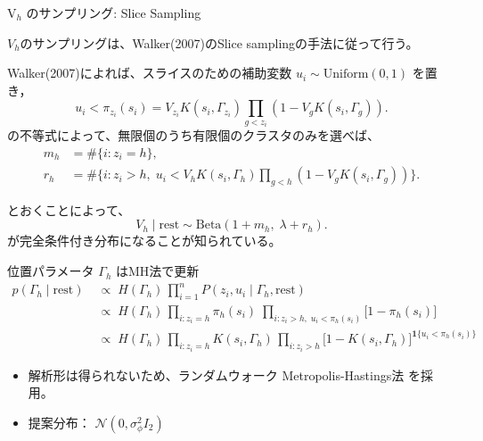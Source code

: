 \documentclass[xelatex, 8pt]{beamer}
\theoremstyle{plain}
\theoremstyle{definition}
\begin{document}
\begin{frame}{V\(_h\) のサンプリング: Slice Sampling}

$V_h$のサンプリングは、Walker(2007)\cite{Walker2007-aj}のSlice samplingの手法に従って行う。

Walker(2007)\cite{Walker2007-aj}によれば、スライスのための補助変数\; \(u_i\sim\text{Uniform}(0,1)\) を置き，
\[
u_i < \pi_{z_i}(s_i)
      = V_{z_i} K(s_i,\Gamma_{z_i})
        \prod_{g<z_i}(1-V_g K(s_i,\Gamma_g)).
\]
の不等式によって、無限個のうち有限個のクラスタのみを選べば、
\[
\begin{aligned}
m_h &= \#\{i : z_i = h\},\\
r_h &= \#\{i : z_i  > h,\;
                u_i < V_h K(s_i,\Gamma_h)
                \prod_{g<h}(1-V_g K(s_i,\Gamma_g))\}.
\end{aligned}
\]

とおくことによって、
\[
V_h \mid \text{rest} \sim \text{Beta}(1+m_h,\; \lambda+r_h).
\]
が完全条件付き分布になることが知られている。

\end{frame}

\begin{frame}{位置パラメータ \(\Gamma_h\) はMH法で更新}
\[
\begin{aligned}
p(\Gamma_h \mid \text{rest})
   &\;\propto\;
     H(\Gamma_h)\,
     \prod_{i=1}^{n}
         P(z_i,u_i \mid \Gamma_h, \text{rest}) \\[4pt]
   &\;\propto\;
     H(\Gamma_h)\,
     {\prod_{i:z_i=h}\pi_h(s_i)}
     \;
     {\prod_{i:z_i>h,\;u_i<\pi_h(s_i)}
                     \bigl[1-\pi_h(s_i)\bigr]}
\\
   &\;\propto\;
     H(\Gamma_h)\,
     \prod_{i:z_i=h}K(s_i,\Gamma_h)\,
     \prod_{i:z_i>h}
       \bigl[1-K(s_i,\Gamma_h)\bigr]^{\mathbf 1\{u_i<\pi_h(s_i)\}}
\end{aligned}
\]

\vspace{4pt}
\begin{itemize}
\item 解析形は得られないため、ランダムウォーク Metropolis-Hastings法 を採用。
\item 提案分布： $\mathcal N(0,\sigma_\phi^{2}I_2)$
\end{itemize}

\end{frame}
\end{document}
